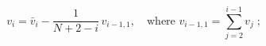 \begin{equation}
v_i=\bar v_i -\frac{1}{N+2-i}\, v_{i-1,1}, \quad \text{where}\,\,
v_{i-1,1} =\sum_{j=2}^{i-1} v_j \; ; 
\label{B13} 
\end{equation}

